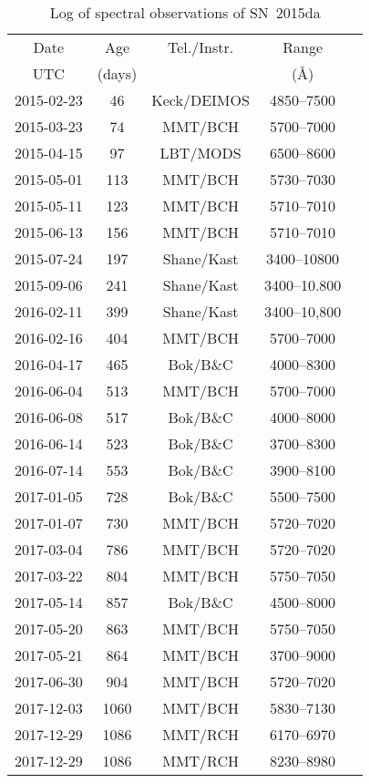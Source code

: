 \documentclass[fleqn,usenatbib,useAMS]{mnras}
\begin{document}
\begin{table}\begin{center}\begin{minipage}{3.25in}
      \caption{Log of spectral observations of SN~2015da}
\centering
\small
\begin{tabular}{@{}ccccc}\hline\hline
Date &Age &Tel./Instr. &Range \\
UTC &(days) & &(\AA) \\
\hline
2015-02-23 &46  &Keck/DEIMOS &4850--7500 \\
2015-03-23 &74  &MMT/BCH    &5700--7000 \\
2015-04-15 &97  &LBT/MODS   &6500--8600 \\
2015-05-01 &113 &MMT/BCH    &5730--7030 \\
2015-05-11 &123 &MMT/BCH    &5710--7010 \\
2015-06-13 &156 &MMT/BCH    &5710--7010 \\
2015-07-24 &197 &Shane/Kast &3400--10800 \\
2015-09-06 &241 &Shane/Kast &3400--10.800 \\
2016-02-11 &399 &Shane/Kast &3400--10,800 \\
2016-02-16 &404 &MMT/BCH    &5700--7000 \\
2016-04-17 &465 &Bok/B\&C   &4000--8300 \\
2016-06-04 &513 &MMT/BCH    &5700--7000 \\
2016-06-08 &517 &Bok/B\&C   &4000--8000 \\
2016-06-14 &523 &Bok/B\&C   &3700--8300 \\
2016-07-14 &553 &Bok/B\&C   &3900--8100 \\
2017-01-05 &728 &Bok/B\&C   &5500--7500 \\
2017-01-07 &730 &MMT/BCH    &5720--7020 \\
2017-03-04 &786 &MMT/BCH    &5720--7020 \\
2017-03-22 &804 &MMT/BCH    &5750--7050 \\
2017-05-14 &857 &Bok/B\&C   &4500--8000 \\
2017-05-20 &863 &MMT/BCH    &5750--7050 \\
2017-05-21 &864 &MMT/BCH    &3700--9000 \\
2017-06-30 &904 &MMT/BCH    &5720--7020 \\
2017-12-03 &1060 &MMT/BCH   &5830--7130 \\
2017-12-29 &1086 &MMT/RCH   &6170--6970 \\
2017-12-29 &1086 &MMT/RCH   &8230--8980 \\

\end{tabular}
\end{minipage}
\end{center}
\end{table}
\end{document}
